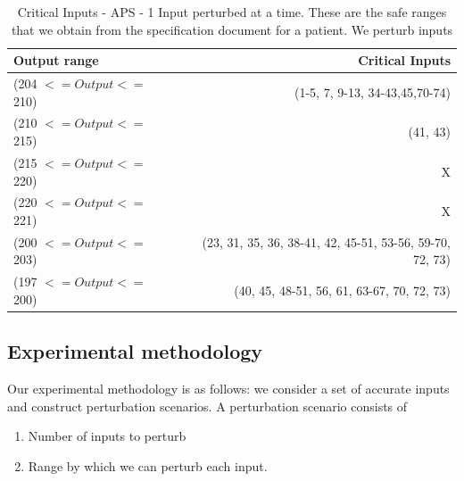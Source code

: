 \begin{table}[h!]
	\begin{center}
		\caption{Critical Inputs - APS - 1 Input perturbed at a time. These are the safe ranges that we obtain from the specification document for a patient. We perturb inputs   }
		\label{criticalinputs}
		\begin{tabular}{|l|r|}
			\textbf{Output range}  & \textbf{Critical Inputs}  \\
			\hline
			(204 $<= Output <=$ 210)&  (1-5, 7, 9-13, 34-43,45,70-74) \\
			
			
			(210 $<= Output <=$ 215) &   (41, 43)\\
			(215 $<= Output <=$ 220) &  X \\
			(220 $<= Output <=$ 221) &  X \\
			(200 $<= Output <=$ 203) &  (23, 31, 35, 36, 38-41, 42, 45-51, 53-56, 59-70, 72, 73) \\
			(197 $<= Output <=$200) & (40, 45, 48-51, 56, 61, 63-67, 70, 72, 73)\\
			\hline
			\hline
			
			
		\end{tabular}
	\end{center}
\end{table}

\subsection{Experimental methodology}

Our experimental methodology is as follows:
we consider a set of accurate inputs and construct perturbation scenarios.
A perturbation scenario consists of
\begin{enumerate}
	\item  Number of inputs to perturb
	\item  Range by which we can perturb each input. 
\end{enumerate}
	
